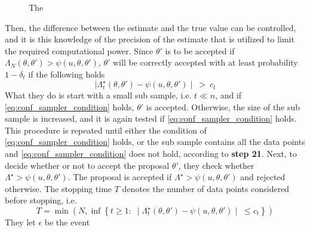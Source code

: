 {\begin{figure}[H]
    \caption{The }
    \label{fig:loglik_ratio_linear_regression}
\end{figure}{}
Then, the difference between the estimate and the true value can be controlled, and it is this knowledge of the precision of the estimate that is utilized to limit the required computational power.
Since $\theta'$ is to be accepted if $\Lambda_N\left(\theta, \theta'\right) > \psi\left(u, \theta, \theta'\right)$,  $\theta'$ will be correctly accepted with at least probability $1 - \delta_t$ if  the following holds 
\begin{equation}\label{eq:conf_sampler_condition}   \mid\Lambda_t^{\star}\left(\theta, \theta'\right) - \psi\left(u, \theta, \theta'\right)\mid \:>\: c_t
\end{equation}
What they do is start with a small sub sample, i.e. $t \ll n$, and if \eqref{eq:conf_sampler_condition} holds, $\theta'$ is accepted. 
Otherwise, the size of the sub sample is increased, and it is again tested if \eqref{eq:conf_sampler_condition} holds.
This procedure is repeated until either the condition of \eqref{eq:conf_sampler_condition} holds, or the sub sample contains all the data points and \eqref{eq:conf_sampler_condition} does not hold, according to \textbf{step 21}. 
Next, to decide whether or not to accept the proposal $\theta'$, 
they check whether $\Lambda^{\star} > \psi \left(u, \theta, \theta ' \right)$. 
The proposal is accepted if $\Lambda^{\star} >  \psi \left(u, \theta, \theta ' \right)$ and rejected otherwise.   
The stopping time $T$ denotes the number of data points considered before stopping, i.e. 
\begin{equation}\label{eq:T_stopping}
    T = \min\left(N, \inf\left\{t\geq 1 :\; \mid \Lambda_t^{\star}\left(\theta, \theta'\right) - \psi\left(u, \theta, \theta'\right)\mid \;\leq c_t\right\}\right)
\end{equation}
They let $\epsilon$ be the event

}
